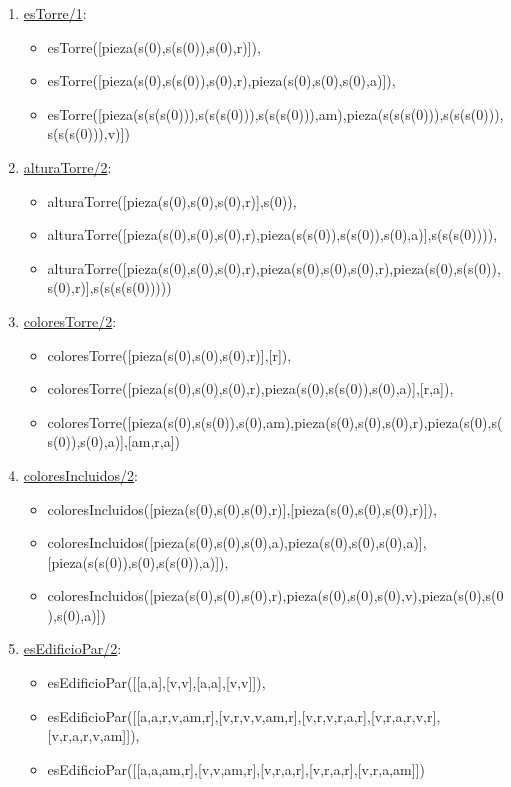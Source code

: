 \documentclass{article}
\begin{document}
\begin{enumerate}
\item \underline{esTorre/1}:
\begin{itemize}
	\item esTorre([pieza(s(0),s(s(0)),s(0),r)]),             
	\item esTorre([pieza(s(0),s(s(0)),s(0),r),pieza(s(0),s(0),s(0),a)]),             
	\item esTorre([pieza(s(s(s(0))),s(s(s(0))),s(s(s(0))),am),pieza(s(s(s(0))),s(s(s(0))),s(s(s(0))),v)])
\end{itemize}

\item \underline{alturaTorre/2}:
\begin{itemize}
	\item alturaTorre([pieza(s(0),s(0),s(0),r)],s(0)),             
	\item alturaTorre([pieza(s(0),s(0),s(0),r),pieza(s(s(0)),s(s(0)),s(0),a)],s(s(s(0)))),   
	\item alturaTorre([pieza(s(0),s(0),s(0),r),pieza(s(0),s(0),s(0),r),pieza(s(0),s(s(0)),s(0),r)],s(s(s(s(0)))))
\end{itemize}

\item \underline{coloresTorre/2}:
\begin{itemize}
	\item coloresTorre([pieza(s(0),s(0),s(0),r)],[r]),             
	\item coloresTorre([pieza(s(0),s(0),s(0),r),pieza(s(0),s(s(0)),s(0),a)],[r,a]),             
	\item coloresTorre([pieza(s(0),s(s(0)),s(0),am),pieza(s(0),s(0),s(0),r),pieza(s(0),s(s(0)),s(0),a)],[am,r,a])
\end{itemize}

\item \underline{coloresIncluidos/2}:
\begin{itemize}
	\item coloresIncluidos([pieza(s(0),s(0),s(0),r)],[pieza(s(0),s(0),s(0),r)]),             
	\item coloresIncluidos([pieza(s(0),s(0),s(0),a),pieza(s(0),s(0),s(0),a)],[pieza(s(s(0)),s(0),s(s(0)),a)]),             
	\item coloresIncluidos([pieza(s(0),s(0),s(0),r),pieza(s(0),s(0),s(0),v),pieza(s(0),s(0),s(0),a)])
\end{itemize}

\item \underline{esEdificioPar/2}:
\begin{itemize}
	\item esEdificioPar([[a,a],[v,v],[a,a],[v,v]]),             
	\item esEdificioPar([[a,a,r,v,am,r],[v,r,v,v,am,r],[v,r,v,r,a,r],[v,r,a,r,v,r],[v,r,a,r,v,am]]),             
	\item esEdificioPar([[a,a,am,r],[v,v,am,r],[v,r,a,r],[v,r,a,r],[v,r,a,am]])
\end{itemize}


\end{enumerate}
\end{document}
